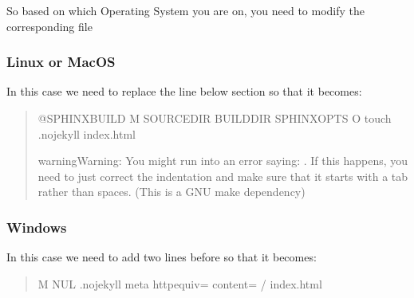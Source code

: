 \documentclass[letterpaper,10pt,english]{sphinxmanual}
\begin{document}
\sphinxAtStartPar
So based on which Operating System you are on, you need to modify the corresponding file


\subsubsection{Linux or MacOS}
\label{\detokenize{usage:linux-or-macos}}
\sphinxAtStartPar
In this case we need to replace the line below  section so that it becomes:
\begin{quote}

\begin{sphinxVerbatim}[commandchars=\\\{\}]
@SPHINXBUILD \PYGZhy{}M  SOURCEDIR BUILDDIR SPHINXOPTS O touch .nojekyll   \PYGZgt{} index.html
\end{sphinxVerbatim}

\begin{sphinxadmonition}{warning}{Warning:}
\sphinxAtStartPar
You might run into an error saying: .
If this happens, you need to just correct the indentation and make sure that it starts with a tab rather than spaces.
(This is a GNU make dependency)
\end{sphinxadmonition}
\end{quote}


\subsubsection{Windows}
\label{\detokenize{usage:windows}}
\sphinxAtStartPar
In this case we need to add two lines before  so that it becomes:
\begin{quote}

\begin{sphinxVerbatim}[commandchars=\\\{\}]
 \PYGZhy{}M     
 NUL  .nojekyll
 meta http\PYGZhy{}equiv= content= /   index.html
 
\end{sphinxVerbatim}
\end{quote}
\end{document}
